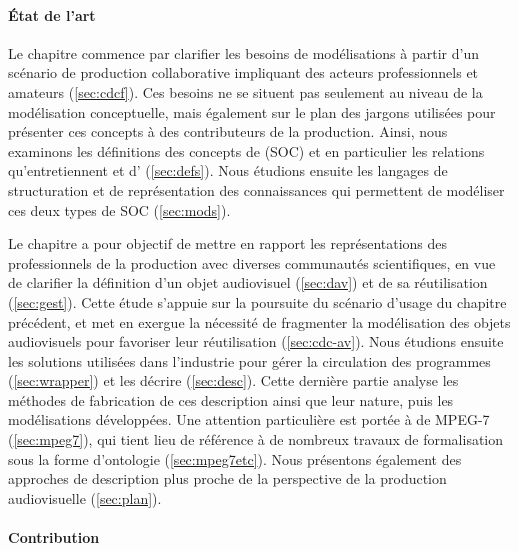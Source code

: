 \paragraph{État de l'art}

Le chapitre  commence par clarifier les besoins de modélisations à partir d'un scénario de production collaborative impliquant des acteurs professionnels et amateurs (\ref{sec:cdcf}).
Ces besoins ne se situent pas seulement au niveau de la modélisation conceptuelle, mais également sur le plan des jargons utilisées pour présenter ces concepts à des contributeurs de la production.
Ainsi, nous examinons les définitions des concepts de  (SOC) et en particulier les relations qu'entretiennent  et d' (\ref{sec:defs}).
Nous étudions ensuite les langages de structuration et de représentation des connaissances qui permettent de modéliser ces deux types de SOC (\ref{sec:mods}).

Le chapitre  a pour objectif de mettre en rapport les représentations des professionnels de la production avec diverses communautés scientifiques, en vue de clarifier la définition d'un objet audiovisuel (\ref{sec:dav}) et de sa réutilisation (\ref{sec:gest}).
Cette étude s'appuie sur la poursuite du scénario d'usage du chapitre précédent, et met en exergue la nécessité de fragmenter la modélisation des objets audiovisuels pour favoriser leur réutilisation (\ref{sec:cdc-av}).
Nous étudions ensuite les solutions utilisées dans l'industrie pour gérer la circulation des programmes (\ref{sec:wrapper}) et les décrire (\ref{sec:desc}).
Cette dernière partie analyse les méthodes de fabrication de ces description ainsi que leur nature, puis les modélisations développées.
Une attention particulière est portée à de MPEG-7 (\ref{sec:mpeg7}), qui tient lieu de référence à de nombreux travaux de formalisation sous la forme d'ontologie (\ref{sec:mpeg7etc}).
Nous présentons également des approches de description plus proche de la perspective de la production audiovisuelle (\ref{sec:plan}).


\paragraph{Contribution}

